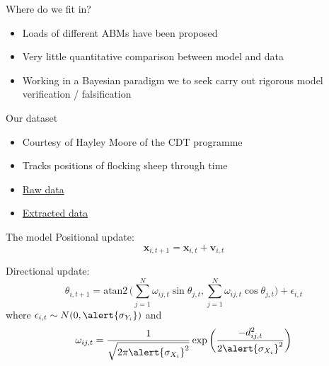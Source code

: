 \documentclass[12pt]{beamer}
\renewcommand{\emph}[1]{{\color{mLightBrown}#1}}
\begin{document}
\begin{frame}{Where do we fit in?}
  \begin{itemize}
    \setlength\itemsep{1em}
    \item Loads of different ABMs have been proposed
    \item Very little \alert{quantitative} comparison between model and data
    \item Working in a \emph{Bayesian} paradigm we to seek carry out rigorous model verification /
          falsification
  \end{itemize}
\end{frame}

\begin{frame}{Our dataset}
  \begin{itemize}
    \setlength\itemsep{1em}
    \item Courtesy of Hayley Moore of the CDT programme
    \item Tracks positions of flocking sheep through time
    \item \alert{\href{https://jwalton.info/assets/pgr_2019/vid1.mp4}{Raw data}}
    \item \alert{\href{https://jwalton.info/assets/pgr_2019/vid2.mp4}{Extracted data}}
  \end{itemize}
\end{frame}

\begin{frame}{The model}
  Positional update:
  \begin{equation*}
    \bm{x}_{i, t+1} = \bm{x}_{i, t} + \bm{v}_{i, t}
  \end{equation*}

  Directional update:
  \begin{equation*}
    \theta_{i, t+1} = \text{atan2}\,\Bigg({\sum_{j=1}^N \omega_{ij, t} \sin \theta_{j, t},
      \sum_{j=1}^N \omega_{ij, t} \cos \theta_{j, t}}\Bigg)
    + \epsilon_{i, t}
  \end{equation*}
  where $\epsilon_{i, t} \sim N(0, \alert{\sigma_{Y_i}})$ and
  \begin{equation*}
    \omega_{ij, t} = \frac{1}{\sqrt{2\pi\alert{\sigma_{X_i}}^2}}
    \exp{\bigg(\frac{-d_{ij, t}^2}{2\alert{\sigma_{X_i}}^2}\bigg)}
  \end{equation*}
\end{frame}
\end{document}
